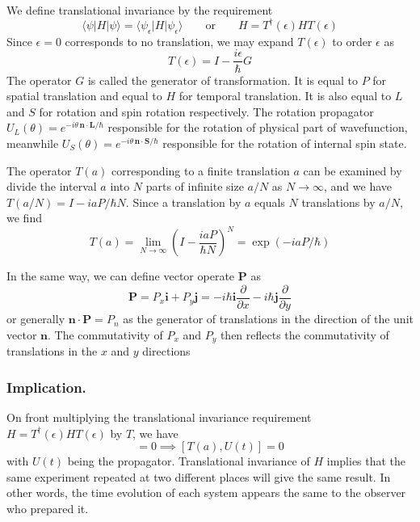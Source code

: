 \documentclass[../../../main.tex]{subfiles}
\begin{document}
We define translational invariance by the requirement
\begin{equation*}
    \langle \psi | H | \psi \rangle = \langle \psi_{\epsilon} | H | \psi_{\epsilon} \rangle \qquad\text{or}\qquad
    H = T ^\dagger(\epsilon)H T(\epsilon)
\end{equation*}
Since $\epsilon=0$ corresponds to no translation, we may expand $T(\epsilon)$ to order $\epsilon$ as
\begin{equation*}
    T(\epsilon) = I - \frac{i \epsilon}{\hbar} G
\end{equation*}
The operator $G$ is called the generator of transformation.
It is equal to $P$ for spatial translation and equal to $H$ for temporal translation.
It is also equal to $L$ and $S$ for rotation and spin rotation respectively.
The rotation propagator $U_L(\theta) = e^{-i\theta\,\mathbf{n}\cdot\mathbf{L}/\hbar}$ responsible for the rotation of physical part of wavefunction, meanwhile $U_S(\theta) = e^{-i\theta\,\mathbf{n}\cdot\mathbf{S}/\hbar}$ responsible for the rotation of internal spin state.



The operator $T(a)$ corresponding to a finite translation $a$ can be examined by divide the interval $a$ into $N$ parts of infinite size $a/N$ as $N \to \infty$, and we have $T(a/N) = I -iaP/\hbar N$.
Since a translation by $a$ equals $N$ translations by $a/N$, we find 
\begin{equation*}
    T(a) = \lim_{N \to \infty} \left( I - \frac{iaP }{\hbar N}\right)^N = \exp \left( -iaP/\hbar \right) 
\end{equation*}

In the same way, we can define vector operate $\mathbf{P}$ as 
\begin{equation*}
    \mathbf{P } = P_x \mathbf{i} + P_y \mathbf{j} = -i \hbar \mathbf{i}\frac{\partial }{\partial x} -i \hbar \mathbf{j} \frac{\partial }{\partial y} 
\end{equation*}
or generally $\mathbf{n} \cdot \mathbf{P} = P_n$ as the generator of translations in the direction of the unit vector $\mathbf{n}$.
The commutativity of $P_x$ and $P_y$ then reflects the commutativity of translations in the $x$ and $y$ directions

\subsubsection{Implication.}
On front multiplying the translational invariance requirement $H = T ^\dagger(\epsilon)H T(\epsilon)$ by $T$, we have 
\begin{equation*}
    [H,T(a)] = 0\implies [T(a),U(t)]=0
\end{equation*}
with $U(t)$ being the propagator.
Translational invariance of $H$ implies that the same experiment repeated at two different places will give the same result.
In other words, the time evolution of each system appears the same to the observer who prepared it.
\end{document}
